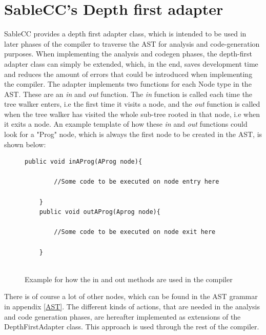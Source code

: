 \section{SableCC's Depth first adapter}
SableCC provides a depth first adapter class, which is intended to be used in later phases of the compiler to traverse the AST for analysis and code-generation purposes. When implementing the analysis and codegen phases, the depth-first adapter class can simply be extended, which, in the end, saves development time and reduces the amount of errors that could be introduced when implementing the compiler. The adapter implements two functions for each Node type in the AST. These are an \textit{in} and \textit{out} function. The \textit{in} function is called each time the tree walker enters, i.e the first time it visits a node, and the \textit{out} function is called when the tree walker has visited the whole sub-tree rooted in that node, i.e when it exits a node. An example template of how these \textit{in} and \textit{out} functions could look for a "Prog" node, which is always the first node to be created in the AST, is shown below:
\begin{figure}[H]
    \centering
    
    \begin{lstlisting}[style=gglang]
    public void inAProg(AProg node){
        
        //Some code to be executed on node entry here
    
    }
    public void outAProg(Aprog node){
    
        //Some code to be executed on node exit here
        
    }
    
    \end{lstlisting}
    \caption{Example for how the in and out methods are used in the \lang{} compiler\label{fig:inout}}
\end{figure}
There is of course a lot of other nodes, which can be found in the AST grammar in appendix \ref{AST}.
The different kinds of actions, that are needed in the analysis and code generation phases, are hereafter implemented as extensions of the DepthFirstAdapter class. This approach is used through the rest of the compiler. 






